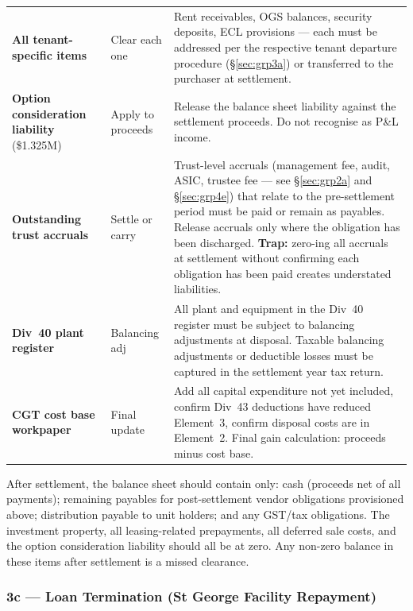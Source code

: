 \documentclass[10pt,a4paper]{article}
\begin{document}
{\begin{longtable}{@{} L{3.2cm} L{1.8cm} L{7.7cm} @{}}
\textbf{All tenant-specific items} & Clear each one & Rent receivables, OGS balances, security deposits, ECL provisions --- each must be addressed per the respective tenant departure procedure (\S\ref{sec:grp3a}) or transferred to the purchaser at settlement. \\
\textbf{Option consideration liability} (\$1.325M) & Apply to proceeds & Release the balance sheet liability against the settlement proceeds. Do not recognise as P\&L income. \\
\textbf{Outstanding trust accruals} & Settle or carry & Trust-level accruals (management fee, audit, ASIC, trustee fee --- see \S\ref{sec:grp2a} and \S\ref{sec:grp4e}) that relate to the pre-settlement period must be paid or remain as payables. Release accruals only where the obligation has been discharged. \textbf{Trap:} zero-ing all accruals at settlement without confirming each obligation has been paid creates understated liabilities. \\
\textbf{Div~40 plant register} & Balancing adj & All plant and equipment in the Div~40 register must be subject to balancing adjustments at disposal. Taxable balancing adjustments or deductible losses must be captured in the settlement year tax return. \\
\textbf{CGT cost base workpaper} & Final update & Add all capital expenditure not yet included, confirm Div~43 deductions have reduced Element~3, confirm disposal costs are in Element~2. Final gain calculation: proceeds minus cost base. \\
\bottomrule
\end{longtable}}

\begin{note}
After settlement, the balance sheet should contain only: cash (proceeds net of all payments); remaining payables for post-settlement vendor obligations provisioned above; distribution payable to unit holders; and any GST/tax obligations. The investment property, all leasing-related prepayments, all deferred sale costs, and the option consideration liability should all be at zero. Any non-zero balance in these items after settlement is a missed clearance.
\end{note}


\subsubsection{3c --- Loan Termination (St George Facility Repayment)}
\label{sec:grp3c}
\end{document}
